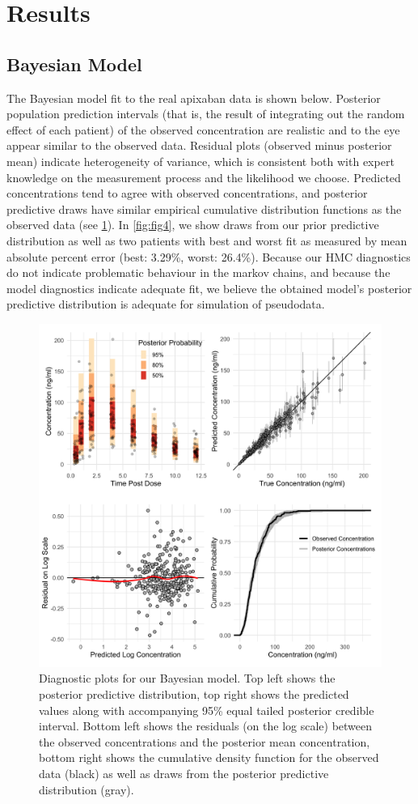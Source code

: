 \section{Results}
\subsection*{Bayesian Model}

The Bayesian model fit to the real apixaban data is shown below.  Posterior population prediction intervals (that is, the result of integrating out the random effect of each patient) of the observed concentration are realistic and to the eye appear similar to the observed data.  Residual plots (observed minus posterior mean) indicate heterogeneity of variance, which is consistent both with expert knowledge on the measurement process and the likelihood we choose. Predicted concentrations tend to agree with observed concentrations, and posterior predictive draws have similar empirical cumulative distribution functions as the observed data (see \cref{fig:fig3}). In \cref{fig:fig4}, we show draws from our prior predictive distribution as well as two patients with best and worst fit as measured by mean absolute percent error (best: 3.29\%, worst: 26.4\%). Because our HMC diagnostics do not indicate problematic behaviour in the markov chains, and because the model diagnostics indicate adequate fit, we believe the obtained model’s posterior predictive distribution is adequate for simulation of pseudodata.


\begin{figure}
	\centering
	\includegraphics[width=0.75\linewidth]{figs/diagnostics}
	\caption{Diagnostic plots for our Bayesian model.  Top left shows the posterior predictive distribution, top right shows the predicted values along with accompanying 95\% equal tailed posterior credible interval. Bottom left shows the residuals (on the log scale) between the observed concentrations and the posterior mean concentration, bottom right shows the cumulative density function for the observed data (black) as well as draws from the posterior predictive distribution (gray).}
	\label{fig:fig3}
\end{figure}


